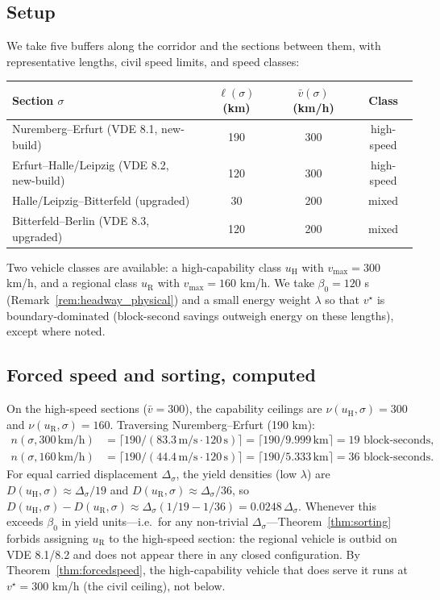 \documentclass[11pt,twocolumn,a4paper]{article}
\theoremstyle{definition}
\theoremstyle{remark}
\newcommand{\blocktime}{\beta_0}
\begin{document}
\subsection{Setup}

We take five buffers along the corridor and the sections between them, with representative lengths, civil speed limits, and speed classes:

\begin{center}
\begin{tabular}{lccc}
\toprule
Section $\sigma$ & $\ell(\sigma)$ (km) & $\bar v(\sigma)$ (km/h) & Class \\
\midrule
Nuremberg--Erfurt (VDE 8.1, new-build) & 190 & 300 & high-speed \\
Erfurt--Halle/Leipzig (VDE 8.2, new-build) & 120 & 300 & high-speed \\
Halle/Leipzig--Bitterfeld (upgraded) & 30 & 200 & mixed \\
Bitterfeld--Berlin (VDE 8.3, upgraded) & 120 & 200 & mixed \\
\bottomrule
\end{tabular}
\end{center}

Two vehicle classes are available: a high-capability class $u_{\mathrm{H}}$ with $v_{\max}=300$ km/h, and a regional class $u_{\mathrm{R}}$ with $v_{\max}=160$ km/h. We take $\blocktime = 120$ s (Remark~\ref{rem:headway_physical}) and a small energy weight $\lambda$ so that $v^\star$ is boundary-dominated (block-second savings outweigh energy on these lengths), except where noted.

\subsection{Forced speed and sorting, computed}

On the high-speed sections ($\bar v = 300$), the capability ceilings are $\nu(u_{\mathrm H},\sigma)=300$ and $\nu(u_{\mathrm R},\sigma)=160$. Traversing Nuremberg--Erfurt (190 km):
\begin{align*}
n(\sigma, 300\,\text{km/h}) &= \lceil 190 / (83.3\,\text{m/s} \cdot 120\,\text{s})\rceil = \lceil 190/9.999\,\text{km}\rceil = 19 \text{ block-seconds},\\
n(\sigma, 160\,\text{km/h}) &= \lceil 190 / (44.4\,\text{m/s} \cdot 120\,\text{s})\rceil = \lceil 190/5.333\,\text{km}\rceil = 36 \text{ block-seconds}.
\end{align*}
For equal carried displacement $\Delta_\sigma$, the yield densities (low $\lambda$) are $D(u_{\mathrm H},\sigma) \approx \Delta_\sigma/19$ and $D(u_{\mathrm R},\sigma)\approx\Delta_\sigma/36$, so $D(u_{\mathrm H},\sigma) - D(u_{\mathrm R},\sigma) \approx \Delta_\sigma(1/19 - 1/36) = 0.0248\,\Delta_\sigma$. Whenever this exceeds $\blocktime$ in yield units---i.e.\ for any non-trivial $\Delta_\sigma$---Theorem~\ref{thm:sorting} forbids assigning $u_{\mathrm R}$ to the high-speed section: the regional vehicle is outbid on VDE 8.1/8.2 and does not appear there in any closed configuration. By Theorem~\ref{thm:forcedspeed}, the high-capability vehicle that does serve it runs at $v^\star = 300$ km/h (the civil ceiling), not below.
\end{document}

